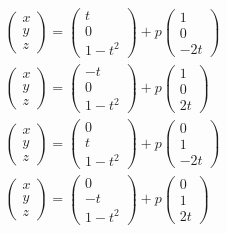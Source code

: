 \documentclass[../../main.tex]{subfiles}
\begin{document}
\begin{align}
  &
  \begin{pmatrix} x \\ y \\ z
  \end{pmatrix} =
  \begin{pmatrix} t \\ 0 \\ 1-t^2
  \end{pmatrix} + p
  \begin{pmatrix} 1 \\ 0 \\ -2t
  \end{pmatrix} \\
  &
  \begin{pmatrix} x \\ y \\ z
  \end{pmatrix} =
  \begin{pmatrix} -t \\ 0 \\ 1-t^2
  \end{pmatrix} + p
  \begin{pmatrix} 1 \\ 0 \\ 2t
  \end{pmatrix} \\
  &
  \begin{pmatrix} x \\ y \\ z
  \end{pmatrix} =
  \begin{pmatrix} 0 \\ t \\ 1-t^2
  \end{pmatrix} + p
  \begin{pmatrix} 0 \\ 1 \\ -2t
  \end{pmatrix} \\
  &
  \begin{pmatrix} x \\ y \\ z
  \end{pmatrix} =
  \begin{pmatrix} 0 \\ -t \\ 1-t^2
  \end{pmatrix} + p
  \begin{pmatrix} 0 \\ 1 \\ 2t
  \end{pmatrix}
\end{align}
\end{document}
